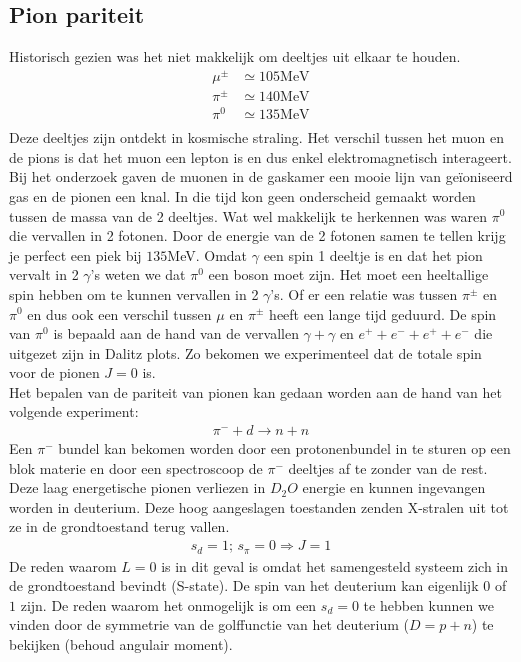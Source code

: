 \documentclass[../main.tex]{subfiles}
\begin{document}
\subsection{Pion pariteit}%
\label{sub:pion_pariteit}

Historisch gezien was het niet makkelijk om deeltjes uit elkaar te houden.
\begin{equation}
    \begin{aligned}
        \label{eq:pion_mass}
        \mu^\pm &\simeq 105 \text{MeV}\\
        \pi^\pm &\simeq 140 \text{MeV}\\
        \pi^0   &\simeq 135 \text{MeV}\\
    \end{aligned}
\end{equation}
Deze deeltjes zijn ontdekt in kosmische straling. Het verschil tussen het muon en de pions is dat het muon een lepton is en dus enkel elektromagnetisch interageert. Bij het onderzoek gaven de muonen in de gaskamer een mooie lijn van geïoniseerd gas en de pionen een knal. In die tijd kon geen onderscheid gemaakt worden tussen de massa van de 2 deeltjes. Wat wel makkelijk te herkennen was waren $\pi^0$ die vervallen in 2 fotonen. Door de energie van de 2 fotonen samen te tellen krijg je perfect een piek bij $135$MeV. Omdat $\gamma$ een spin 1 deeltje is en dat het pion vervalt in 2 $\gamma$'s weten we dat $\pi^0$ een boson moet zijn. Het moet een heeltallige spin hebben om te kunnen vervallen in 2 $\gamma$'s. Of er een relatie was tussen $\pi^\pm$ en $\pi^0$ en dus ook een verschil tussen $\mu$ en $\pi^\pm$ heeft een lange tijd geduurd. De spin van $\pi^0$ is bepaald aan de hand van de vervallen $\gamma+\gamma$ en $e^++e^-+e^++e^-$ die uitgezet zijn in Dalitz plots. Zo bekomen we experimenteel dat de totale spin voor de pionen $J=0$ is.\\
Het bepalen van de pariteit van pionen kan gedaan worden aan de hand van het volgende experiment:
\begin{equation}
    \begin{aligned}
        \label{eq:pion_pariteit}
        \pi^- + d \rightarrow n + n
    \end{aligned}
\end{equation}
Een $\pi^-$ bundel kan bekomen worden door een protonenbundel in te sturen op een blok materie en door een spectroscoop de $\pi^-$ deeltjes af te zonder van de rest. Deze laag energetische pionen verliezen in $D_2O$ energie en kunnen ingevangen worden in deuterium. Deze hoog aangeslagen toestanden zenden X-stralen uit tot ze in de grondtoestand terug vallen.
\begin{equation}
    \begin{aligned}
        \label{eq:grondtoestand_deuteron}
        s_d=1\text{; }s_\pi=0 \Rightarrow J=1
    \end{aligned}
\end{equation}
De reden waarom $L=0$ is in dit geval is omdat het samengesteld systeem zich in de grondtoestand bevindt (S-state). De spin van het deuterium kan eigenlijk $0$ of $1$ zijn. De reden waarom het onmogelijk is om een $s_d=0$ te hebben kunnen we vinden door de symmetrie van de golffunctie van het deuterium ($D=p+n$) te bekijken (behoud angulair moment).
\end{document}
